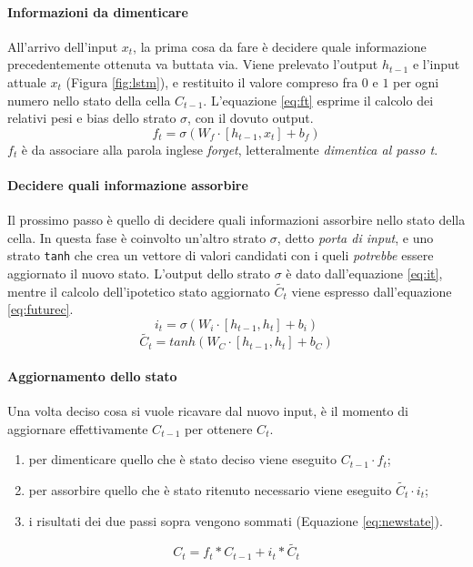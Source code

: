 \documentclass[twoside,twocolumn,11pt]{extarticle}
\theoremstyle{definition}
\begin{document}
		\paragraph{Informazioni da dimenticare}
			All'arrivo dell'input $x_t$, la prima cosa da fare è decidere quale informazione precedentemente ottenuta va buttata via. Viene prelevato l'output $h_{t - 1}$ e l'input attuale $x_t$ (Figura \ref{fig:lstm}), e restituito il valore compreso fra $0$ e $1$ per ogni numero nello stato della cella $C_{t - 1}$. L'equazione \ref{eq:ft} esprime il calcolo dei relativi pesi e bias dello strato $\sigma$, con il dovuto output.
			\begin{equation}\label{eq:ft}
				f_t = \sigma(W_f \cdot [h_{t - 1}, x_t] + b_f)
			\end{equation}
			$f_t$ è da associare alla parola inglese \textit{forget}, letteralmente \textit{dimentica al passo t}.
		
		\paragraph{Decidere quali informazione assorbire}
			Il prossimo passo è quello di decidere quali informazioni assorbire nello stato della cella. In questa fase è coinvolto un'altro strato $\sigma$, detto \textit{porta di input}, e uno strato \texttt{tanh} che crea un vettore di valori candidati con i queli \textit{potrebbe} essere aggiornato il nuovo stato. L'output dello strato $\sigma$ è dato dall'equazione \ref{eq:it}, mentre il calcolo dell'ipotetico stato aggiornato $\tilde{C_t}$ viene espresso dall'equazione \ref{eq:futurec}.
			\begin{equation}\label{eq:it}
				i_t = \sigma(W_i \cdot [h_{t - 1}, h_t] + b_i)
			\end{equation}
			\begin{equation}\label{eq:futurec}
				\tilde{C_t} = tanh(W_C \cdot [h_{t - 1}, h_t] + b_C)
			\end{equation}
			
		\paragraph{Aggiornamento dello stato}
			Una volta deciso cosa si vuole ricavare dal nuovo input, è il momento di aggiornare effettivamente $C_{t - 1}$ per ottenere $C_t$.
			\begin{enumerate}
				\item per dimenticare quello che è stato deciso viene eseguito $C_{t - 1} \cdot f_t$;
				\item per assorbire quello che è stato ritenuto necessario viene eseguito $\tilde{C_t} \cdot i_t$;
				\item i risultati dei due passi sopra vengono sommati (Equazione \ref{eq:newstate}).
			\end{enumerate}
			\begin{equation}\label{eq:newstate}
				C_t = f_t * C_{t - 1} + i_t * \tilde{C_t}
			\end{equation}
		
\end{document}
